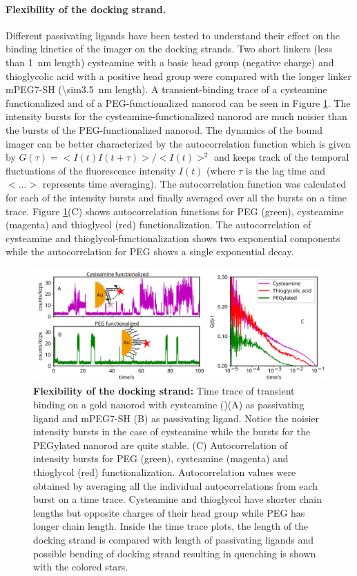 \paragraph*{Flexibility of the docking strand.} Different passivating ligands have been tested to understand their effect on the binding kinetics of the imager on the docking strands.
Two short linkers (less than \SI{1}{\nm} length) cysteamine with a basic head group (negative charge) and thioglycolic acid with a positive head group were compared with the longer linker mPEG7-SH (\SI{\sim3.5}{\nm} length).
A transient-binding trace of a cysteamine functionalized and of a PEG-functionalized nanorod can be seen in Figure \ref{fig:timetraceCysvsPeg}.
The intensity bursts for the cysteamine-functionalized nanorod are much noisier than the bursts of the PEG-functionalized nanorod.
The dynamics of the bound imager can be better characterized by the autocorrelation function which is given by $G(\tau)=<I(t)I(t+\tau)>/<I(t)>^2$ and keeps track of the temporal fluctuations of the fluorescence intensity $I(t)$ (where $\tau$ is the lag time and $<...>$ represents time averaging).
The autocorrelation function was calculated for each of the intensity bursts and finally averaged over all the bursts on a time trace.
Figure \ref{fig:timetraceCysvsPeg}(C) shows autocorrelation functions for  PEG (green), cysteamine (magenta) and thioglycol (red) functionalization.
The autocorrelation of cysteamine and thioglycol-functionalization shows two exponential components while the autocorrelation for PEG shows a single exponential decay.
\begin{figure}[ht]
	\centering
	\includegraphics[width=\textwidth]{timetraceCysvsPeg}
	\caption{\textbf{Flexibility of the docking strand:} Time trace of transient binding on a gold nanorod with cysteamine ()(A) as passivating ligand and mPEG7-SH (B) as passivating ligand.
	Notice the noisier intensity bursts in the case of cysteamine while the bursts for the PEGylated nanorod are quite stable.
	(C) Autocorrelation of intensity bursts for PEG (green), cysteamine (magenta) and thioglycol (red) functionalization.
	Autocorrelation values were obtained by averaging all the individual autocorrelations from each burst on a time trace. 
	Cysteamine and thioglycol have shorter chain lengths but opposite charges of their head group while PEG has longer chain length.
	Inside the time trace plots, the length of the docking strand is compared with length of passivating ligands and possible bending of docking strand resulting in quenching is shown with the colored stars.}
  	\label{fig:timetraceCysvsPeg}
\end{figure}



